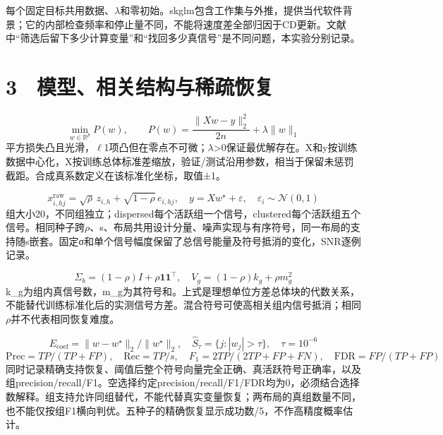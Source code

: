 \documentclass[UTF8,fontset=fandol,10pt]{ctexart}
\begin{document}
每个固定目标共用数据、\ensuremath{\lambda}和零初始。skglm包含工作集与外推，提供当代软件背景；它的内部检查频率和停止量不同，不能将速度差全部归因于CD更新。文献中“筛选后留下多少计算变量”和“找回多少真信号”是不同问题，本实验分别记录。

\clearpage
\section*{3　模型、相关结构与稀疏恢复}
\begin{equation}\min_{w\in\mathbb{R}^p}P(w),\qquad P(w)=\frac{\|Xw-y\|_2^2}{2n}+\lambda\|w\|_1\end{equation}
平方损失凸且光滑，\ensuremath{\ell}1项凸但在零点不可微；\ensuremath{\lambda}>0保证最优解存在。X和y按训练数据中心化，X按训练总体标准差缩放，验证/测试沿用参数，相当于保留未惩罚截距。合成真系数定义在该标准化坐标，取值±1。

\begin{equation}x^{\mathrm{raw}}_{i,hj}=\sqrt{\rho}\,z_{i,h}+\sqrt{1-\rho}\,e_{i,hj},\quad y=Xw^\star+\varepsilon,\quad\varepsilon_i\sim\mathcal{N}(0,1)\end{equation}
组大小20，不同组独立；dispersed每个活跃组一个信号，clustered每个活跃组五个信号。相同种子跨\ensuremath{\rho}、s、布局共用设计分量、噪声实现与有序符号，同一布局的支持随s嵌套。固定σ和单个信号幅度保留了总信号能量及符号抵消的变化，SNR逐例记录。

\begin{equation}\Sigma_b=(1-\rho)I+\rho\mathbf{1}\mathbf{1}^\top,\quad V_g=(1-\rho)k_g+\rho m_g^2\end{equation}
k\_g为组内真信号数，m\_g为其符号和。上式是理想单位方差总体块的代数关系，不能替代训练标准化后的实测信号方差。混合符号可使高相关组内信号抵消；相同\ensuremath{\rho}并不代表相同恢复难度。

\begin{equation}E_{\mathrm{coef}}=\|w-w^\star\|_2/\|w^\star\|_2,\quad \widehat S_\tau=\{j:|w_j|>\tau\},\quad \tau=10^{-6}\end{equation}
\begin{equation}\mathrm{Prec}=TP/(TP+FP),\quad\mathrm{Rec}=TP/s,\quad F_1=2TP/(2TP+FP+FN),\quad\mathrm{FDR}=FP/(TP+FP)\end{equation}
同时记录精确支持恢复、阈值后整个符号向量完全正确、真活跃符号正确率，以及组precision/recall/F1。空选择约定precision/recall/F1/FDR均为0，必须结合选择数解释。组支持允许同组替代，不能代替真实变量恢复；两布局的真组数量不同，也不能仅按组F1横向判优。五种子的精确恢复显示成功数/5，不作高精度概率估计。
\end{document}
